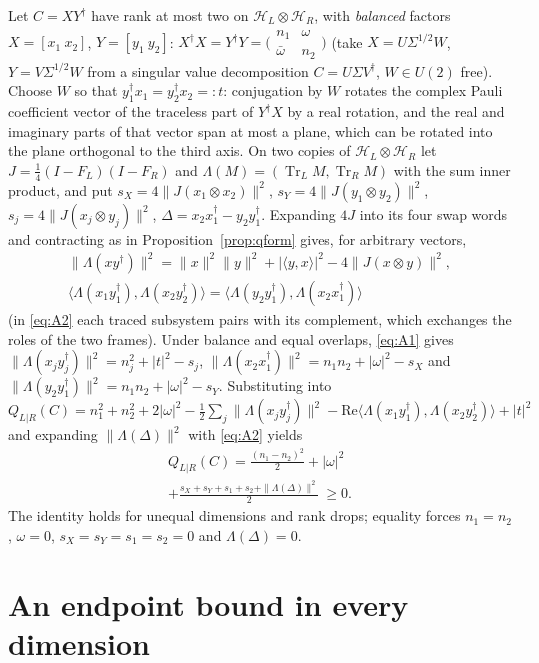 \documentclass[aps,pra,twocolumn,superscriptaddress,nofootinbib,longbibliography]{revtex4-2}
\newcommand{\Hh}{\mathcal H}
\newcommand{\ip}[2]{\langle #1,#2\rangle}
\DeclareMathOperator{\Tr}{Tr}
\theoremstyle{plain}
\theoremstyle{definition}
\theoremstyle{remark}
\begin{document}
Let $C=XY^\dagger$ have rank at most two on $\Hh_L\otimes\Hh_R$, with \emph{balanced} factors $X=[x_1\ x_2]$, $Y=[y_1\ y_2]$: $X^\dagger X=Y^\dagger Y=\bigl(\begin{smallmatrix}n_1&\omega\\\bar\omega&n_2\end{smallmatrix}\bigr)$ (take $X=U\Sigma^{1/2}W$, $Y=V\Sigma^{1/2}W$ from a singular value decomposition $C=U\Sigma V^\dagger$, $W\in U(2)$ free). Choose $W$ so that $y_1^\dagger x_1=y_2^\dagger x_2=:t$: conjugation by $W$ rotates the complex Pauli coefficient vector of the traceless part of $Y^\dagger X$ by a real rotation, and the real and imaginary parts of that vector span at most a plane, which can be rotated into the plane orthogonal to the third axis. On two copies of $\Hh_L\otimes\Hh_R$ let $J=\tfrac14(I-F_L)(I-F_R)$ and $\Lambda(M)=(\Tr_LM,\Tr_RM)$ with the sum inner product, and put
$s_X=4\|J(x_1\otimes x_2)\|^2$, $s_Y=4\|J(y_1\otimes y_2)\|^2$, $s_j=4\|J(x_j\otimes y_j)\|^2$, $\Delta=x_2x_1^\dagger-y_2y_1^\dagger$.
Expanding $4J$ into its four swap words and contracting as in Proposition~\ref{prop:qform} gives, for arbitrary vectors,
\begin{gather}
\|\Lambda(xy^\dagger)\|^2=\|x\|^2\|y\|^2+|\ip yx|^2-4\|J(x\otimes y)\|^2,\label{eq:A1}\\
\ip{\Lambda(x_1y_1^\dagger)}{\Lambda(x_2y_2^\dagger)}=\ip{\Lambda(y_2y_1^\dagger)}{\Lambda(x_2x_1^\dagger)}\label{eq:A2}
\end{gather}
(in \eqref{eq:A2} each traced subsystem pairs with its complement, which exchanges the roles of the two frames). Under balance and equal overlaps, \eqref{eq:A1} gives $\|\Lambda(x_jy_j^\dagger)\|^2=n_j^2+|t|^2-s_j$, $\|\Lambda(x_2x_1^\dagger)\|^2=n_1n_2+|\omega|^2-s_X$ and $\|\Lambda(y_2y_1^\dagger)\|^2=n_1n_2+|\omega|^2-s_Y$. Substituting into
$Q_{L|R}(C)=n_1^2+n_2^2+2|\omega|^2-\tfrac12\sum_j\|\Lambda(x_jy_j^\dagger)\|^2-\mathrm{Re}\ip{\Lambda(x_1y_1^\dagger)}{\Lambda(x_2y_2^\dagger)}+|t|^2$ and expanding $\|\Lambda(\Delta)\|^2$ with \eqref{eq:A2} yields
\begin{multline}\label{eq:cutSOS}
Q_{L|R}(C)=\frac{(n_1-n_2)^2}2+|\omega|^2\\+\frac{s_X+s_Y+s_1+s_2+\|\Lambda(\Delta)\|^2}2\ \ge0 .
\end{multline}
The identity holds for unequal dimensions and rank drops; equality forces $n_1=n_2$, $\omega=0$, $s_X=s_Y=s_1=s_2=0$ and $\Lambda(\Delta)=0$.


\section{An endpoint bound in every dimension}\label{app:bound}
\end{document}
